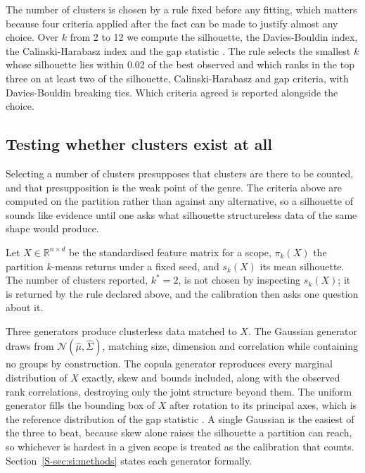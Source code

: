 The number of clusters is chosen by a rule fixed before any fitting, which matters because four
criteria applied after the fact can be made to justify almost any choice. Over $k$ from 2 to 12
we compute the silhouette, the Davies-Bouldin index, the Calinski-Harabasz index and the gap
statistic \citep{rousseeuw1987silhouettes, tibshirani2001estimating}. The rule selects the
smallest $k$ whose silhouette lies within 0.02 of the best observed and which ranks in the top
three on at least two of the silhouette, Calinski-Harabasz and gap criteria, with Davies-Bouldin
breaking ties. Which criteria agreed is reported alongside the choice.

\subsection{Testing whether clusters exist at all}
\label{sec:methods:null}

Selecting a number of clusters presupposes that clusters are there to be counted, and that
presupposition is the weak point of the genre. The criteria above are computed on the partition
rather than against any alternative, so a silhouette of \StrObsAll{} sounds like evidence until
one asks what silhouette structureless data of the same shape would produce.

Let $X \in \mathbb{R}^{n \times d}$ be the standardised feature matrix for a scope, $\pi_k(X)$
the partition $k$-means returns under a fixed seed, and $s_k(X)$ its mean silhouette. The number
of clusters reported, $k^\ast = 2$, is not chosen by inspecting $s_k(X)$; it is returned by the
rule declared above, and the calibration then asks one question about it.

Three generators produce clusterless data matched to $X$. The Gaussian generator draws from
$\mathcal{N}(\hat\mu, \hat\Sigma)$, matching size, dimension and correlation while containing no
groups by construction. The copula generator reproduces every marginal distribution of $X$
exactly, skew and bounds included, along with the observed rank correlations, destroying only
the joint structure beyond them. The uniform generator fills the bounding box of $X$ after
rotation to its principal axes, which is the reference distribution of the gap statistic
\citep{tibshirani2001estimating}. A single Gaussian is the easiest of the three to beat, because
skew alone raises the silhouette a partition can reach, so whichever is hardest in a given scope
is treated as the calibration that counts. Section~\ref{S-sec:si:methods} states each generator
formally.

